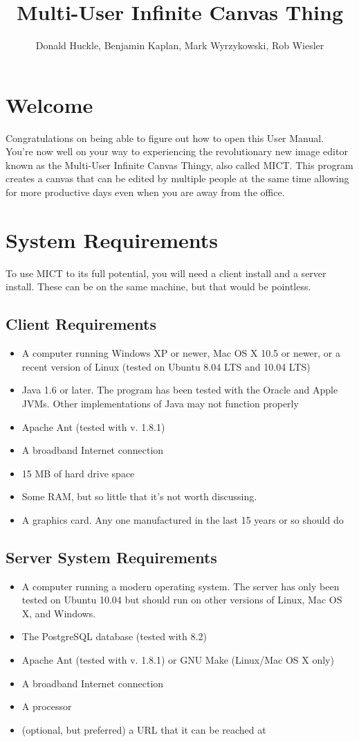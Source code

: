\documentclass[11pt,oneside,a4paper]{article}
\title{Multi-User Infinite Canvas Thing}
\author{Donald Huckle, Benjamin Kaplan, Mark Wyrzykowski, Rob Wiesler}
\begin{document}
\maketitle
\pagebreak
\tableofcontents
\pagebreak
\section{Welcome}
Congratulations on being able to figure out how to open this User Manual.
You're now well on your way to experiencing the revolutionary new image editor
known as the Multi-User Infinite Canvas Thingy, also called MICT. This program
creates a canvas that can be edited by multiple people at the same time
allowing for more productive days even when you are away from the office.

\section{System Requirements}
To use MICT to its full potential, you will need a client install and a server
install. These can be on the same machine, but that would be pointless.

\subsection{Client Requirements}
\begin{itemize}
\item A computer running Windows XP or newer, Mac OS X 10.5 or newer, or a
recent version of Linux (tested on Ubuntu 8.04 LTS and 10.04 LTS)
\item Java 1.6 or later. The program has been tested with the Oracle and Apple
JVMs. Other implementations of Java may not function properly
\item Apache Ant (tested with v. 1.8.1)
\item A broadband Internet connection
\item 15 MB of hard drive space
\item Some RAM, but so little that it's not worth discussing.
\item A graphics card. Any one manufactured in the last 15 years or so should
do

\end{itemize}
\subsection{Server System Requirements}
\begin{itemize}
\item A computer running a modern operating system. The server has only been
tested on Ubuntu 10.04 but should run on other versions of Linux, Mac OS X, and
Windows.
\item The PostgreSQL database (tested with 8.2)
\item Apache Ant (tested with v. 1.8.1) or GNU Make (Linux/Mac OS X only)
\item A broadband Internet connection
\item A processor
\item (optional, but preferred) a URL that it can be reached at
\end{itemize}
\end{document}
